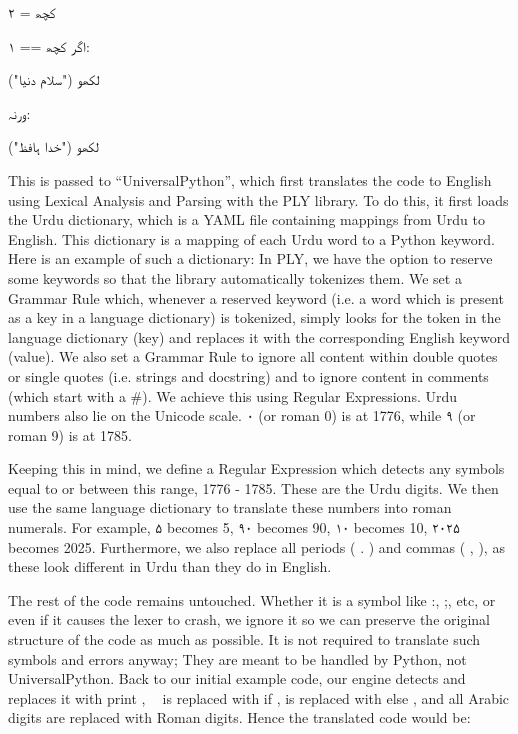 \documentclass[conference]{IEEEtran}
\begin{document}
\begin{urdu} %
\urdufont 
کچھ = ۲

اگر کچھ == ۱:

\quad لکھو ("سلام دنیا")

ورنہ:

\quad لکھو ("خدا ہافظ")

\end{urdu} %

This is passed to “UniversalPython”, which first translates the code to English using Lexical Analysis and Parsing with the PLY library.
To do this, it first loads the Urdu dictionary, which is a YAML file containing mappings from Urdu to English. This dictionary is a mapping of each Urdu word to a Python keyword. Here is an example of such a dictionary:
In PLY, we have the option to reserve some keywords so that the library automatically tokenizes them. We set a Grammar Rule which, whenever a reserved keyword (i.e. a word which is present as a key in a language dictionary) is tokenized, simply looks for the token in the language dictionary (key) and replaces it with the corresponding English keyword (value).
We also set a Grammar Rule to ignore all content within double quotes or single quotes (i.e. strings and docstring) and to ignore content in comments (which start with a \#). We achieve this using Regular Expressions.
Urdu numbers also lie on the Unicode scale. \texturdu{۰} (or roman 0) is at 1776, while \texturdu{۹} (or roman 9) is at 1785.

Keeping this in mind, we define a Regular Expression which detects any symbols equal to or between this range, 1776 - 1785. These are the Urdu digits. We then use the same language dictionary to translate these numbers into roman numerals. For example, \texturdu{۵} becomes 5, \texturdu{۹۰} becomes 90, \texturdu{۱۰} becomes 10, \texturdu{۲۰۲۵} becomes 2025.
Furthermore, we also replace all periods ( . ) and commas ( , ), as these look different in Urdu than they do in English.

The rest of the code remains untouched. Whether it is a symbol like :, ;, etc, or even if it causes the lexer to crash, we ignore it so we can preserve the original structure of the code as much as possible. It is not required to translate such symbols and errors anyway; They are meant to be handled by Python, not UniversalPython. Back to our initial example code, our engine detects and replaces it with print , 􏰁􏰃 is replaced with if ,
is replaced with else , and all Arabic digits are replaced with Roman digits. Hence the translated code would be:
\end{document}
